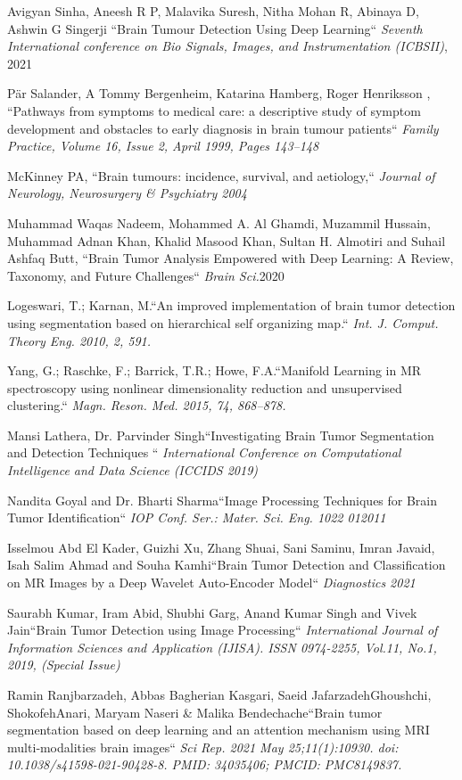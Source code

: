 Avigyan Sinha, Aneesh R P, Malavika Suresh, Nitha Mohan R, Abinaya D, Ashwin G Singerji ``Brain Tumour Detection Using Deep Learning`` \textit{Seventh International conference on Bio Signals, Images, and Instrumentation (ICBSII)}, 2021

Pär Salander, A Tommy Bergenheim, Katarina Hamberg, Roger Henriksson , ``Pathways from symptoms to medical care: a descriptive study of symptom development and obstacles to early diagnosis in brain tumour patients`` \textit{Family Practice, Volume 16, Issue 2, April 1999, Pages 143–148}

McKinney PA, ``Brain tumours: incidence, survival, and aetiology,`` \textit{Journal of Neurology, Neurosurgery \& Psychiatry 2004}

Muhammad Waqas Nadeem, Mohammed A. Al Ghamdi, Muzammil Hussain, Muhammad Adnan Khan, Khalid Masood Khan, Sultan H. Almotiri and Suhail Ashfaq Butt, ``Brain Tumor Analysis Empowered with Deep Learning: A Review, Taxonomy, and Future Challenges`` \textit{Brain Sci.}2020

Logeswari, T.; Karnan, M.``An improved implementation of brain tumor detection using segmentation based on hierarchical self organizing map.`` \textit{Int. J. Comput. Theory Eng. 2010, 2, 591.}

Yang, G.; Raschke, F.; Barrick, T.R.; Howe, F.A.``Manifold Learning in MR spectroscopy using nonlinear dimensionality reduction and unsupervised clustering.`` \textit{Magn. Reson. Med. 2015, 74, 868–878. }

Mansi Lathera, Dr. Parvinder Singh``Investigating Brain Tumor Segmentation and Detection Techniques `` \textit{International Conference on Computational Intelligence and Data Science (ICCIDS 2019)}

Nandita Goyal and Dr. Bharti Sharma``Image Processing Techniques for Brain Tumor Identification`` \textit{IOP Conf. Ser.: Mater. Sci. Eng. 1022 012011}

Isselmou Abd El Kader, Guizhi Xu, Zhang Shuai, Sani Saminu, Imran Javaid, Isah Salim Ahmad and Souha Kamhi``Brain Tumor Detection and Classification on MR Images by a Deep Wavelet Auto-Encoder Model`` \textit{Diagnostics 2021}

Saurabh Kumar, Iram Abid, Shubhi Garg, Anand Kumar Singh and Vivek Jain``Brain Tumor Detection using Image Processing`` \textit{International Journal of Information Sciences and Application (IJISA). ISSN 0974-2255, Vol.11, No.1, 2019, (Special Issue)}

Ramin Ranjbarzadeh, Abbas Bagherian Kasgari, Saeid JafarzadehGhoushchi, ShokofehAnari, Maryam Naseri \& Malika Bendechache``Brain tumor segmentation based on deep learning and an attention mechanism using MRI multi‑modalities brain images`` \textit{Sci Rep. 2021 May 25;11(1):10930. doi: 10.1038/s41598-021-90428-8. PMID: 34035406; PMCID: PMC8149837.}